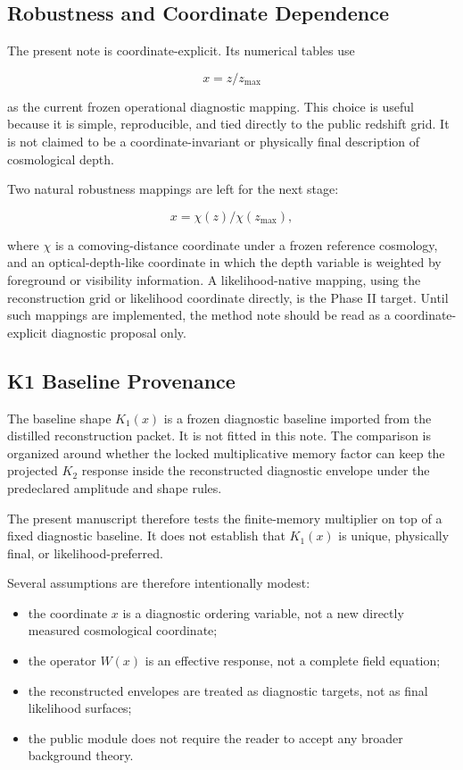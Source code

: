 \documentclass[11pt]{article}
\begin{document}
\subsection{Robustness and Coordinate Dependence}

The present note is coordinate-explicit. Its numerical tables use

\[
x = z/z_{\max}
\]

as the current frozen operational diagnostic mapping. This choice is useful
because it is simple, reproducible, and tied directly to the public redshift
grid. It is not claimed to be a coordinate-invariant or physically final
description of cosmological depth.

Two natural robustness mappings are left for the next stage:

\[
x = \chi(z)/\chi(z_{\max}),
\]

where $\chi$ is a comoving-distance coordinate under a frozen reference
cosmology, and an optical-depth-like coordinate in which the depth variable is
weighted by foreground or visibility information. A likelihood-native mapping,
using the reconstruction grid or likelihood coordinate directly, is the Phase II
target. Until such mappings are implemented, the method note should be read as
a coordinate-explicit diagnostic proposal only.

\subsection{K1 Baseline Provenance}

The baseline shape $K_1(x)$ is a frozen diagnostic baseline imported from the
distilled reconstruction packet. It is not fitted in this note. The comparison
is organized around whether the locked multiplicative memory factor can keep
the projected $K_2$ response inside the reconstructed diagnostic envelope under
the predeclared amplitude and shape rules.

The present manuscript therefore tests the finite-memory multiplier on top of a
fixed diagnostic baseline. It does not establish that $K_1(x)$ is unique,
physically final, or likelihood-preferred.

Several assumptions are therefore intentionally modest:

\begin{itemize}
\item the coordinate $x$ is a diagnostic ordering variable, not a new directly measured cosmological coordinate;
\item the operator $W(x)$ is an effective response, not a complete field equation;
\item the reconstructed envelopes are treated as diagnostic targets, not as final likelihood surfaces;
\item the public module does not require the reader to accept any broader background theory.
\end{itemize}
\end{document}
